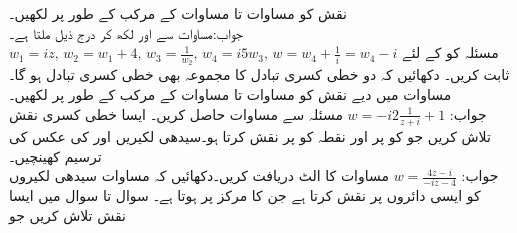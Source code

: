 \quad
نقش  کو مساوات  تا مساوات  کے مرکب کے طور پر لکھیں۔\\
جواب:\quad مساوات  سے  اور   لکھ کر درج ذیل ملتا ہے۔\\
 $w_1=iz,\, w_2=w_1+4,\, w_3=\tfrac{1}{w_2},\, w_4=i5w_3,\,w=w_4+\tfrac{1}{i}=w_4-i$
\quad
مسئلہ  کو  کے لئے ثابت کریں۔
\quad
دکھائیں کہ دو خطی کسری تبادل کا مجموعہ بھی خطی کسری تبادل ہو گا۔
\quad
مساوات  میں دیے نقش کو مساوات  تا مساوات  کے مرکب کے طور پر لکھیں۔\\
جواب:\quad
$w=-i2\tfrac{1}{z+i}+1$
\quad
مسئلہ  سے مساوات  حاصل کریں۔
\quad
ایسا خطی کسری نقش تلاش کریں جو  کو  پر اور نقطہ  کو  پر نقش کرتا ہو۔سیدھی لکیریں  اور  کی عکس کی ترسیم کھینچیں۔\\
جواب:\quad
$w=\tfrac{4z-i}{-iz-4}$
\quad
مساوات  کا الٹ دریافت کریں۔دکھائیں کہ مساوات  سیدھی  لکیروں کو ایسی دائروں پر نقش کرتا ہے جن کا مرکز  پر ہوتا ہے۔ 
سوال  تا سوال  میں ایسا نقش تلاش کریں جو

